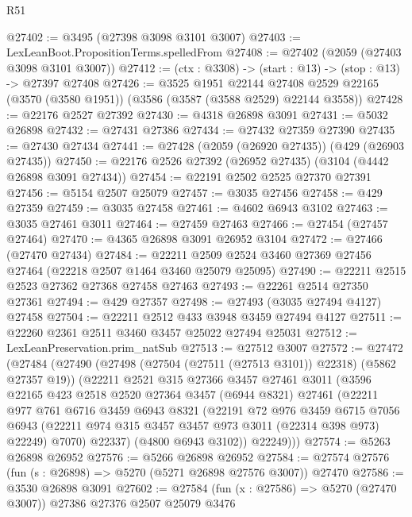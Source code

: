 \begin{lexlean}{R51}
\begin{coremodule}
@27402 := @3495 (@27398 @3098 @3101 @3007)
@27403 := LexLeanBoot.PropositionTerms.spelledFrom
@27408 := @27402 (@2059 (@27403 @3098 @3101 @3007))
@27412 := (ctx : @3308) -> (start : @13) -> (stop : @13) -> @27397 @27408
@27426 := @3525
    @1951
    @22144
    @27408
    @2529
    @22165
    (@3570 (@3580 @1951))
    (@3586 (@3587 (@3588 @2529) @22144 @3558))
@27428 := @22176 @2527 @27392
@27430 := @4318 @26898 @3091
@27431 := @5032 @26898
@27432 := @27431 @27386
@27434 := @27432 @27359 @27390
@27435 := @27430 @27434
@27441 := @27428 (@2059 (@26920 @27435)) (@429 (@26903 @27435))
@27450 := @22176 @2526 @27392 (@26952 @27435) (@3104 (@4442 @26898 @3091 @27434))
@27454 := @22191 @2502 @2525 @27370 @27391
@27456 := @5154 @2507 @25079
@27457 := @3035 @27456
@27458 := @429 @27359
@27459 := @3035 @27458
@27461 := @4602 @6943 @3102
@27463 := @3035 @27461 @3011
@27464 := @27459 @27463
@27466 := @27454 (@27457 @27464)
@27470 := @4365 @26898 @3091 @26952 @3104
@27472 := @27466 (@27470 @27434)
@27484 := @22211 @2509 @2524 @3460 @27369 @27456 @27464 (@22218 @2507 @1464 @3460 @25079 @25095)
@27490 := @22211 @2515 @2523 @27362 @27368 @27458 @27463
@27493 := @22261 @2514 @27350 @27361
@27494 := @429 @27357
@27498 := @27493 (@3035 @27494 @4127) @27458
@27504 := @22211 @2512 @433 @3948 @3459 @27494 @4127
@27511 := @22260 @2361 @2511 @3460 @3457 @25022 @27494 @25031
@27512 := LexLeanPreservation.prim_natSub
@27513 := @27512 @3007
@27572 := @27472
    (@27484
      (@27490
        (@27498 (@27504 (@27511 (@27513 @3101)) @22318) (@5862 @27357 @19))
        (@22211
          @2521
          @315
          @27366
          @3457
          @27461
          @3011
          (@3596
            @22165
            @423
            @2518
            @2520
            @27364
            @3457
            (@6944 @8321)
            @27461
            (@22211
              @977
              @761
              @6716
              @3459
              @6943
              @8321
              (@22191
                @72
                @976
                @3459
                @6715
                @7056
                @6943
                (@22211 @974 @315 @3457 @3457 @973 @3011 (@22314 @398 @973) @22249)
                @7070)
              @22337)
            (@4800 @6943 @3102))
          @22249)))
@27574 := @5263 @26898 @26952
@27576 := @5266 @26898 @26952
@27584 := @27574 @27576 (fun (s : @26898) => @5270 (@5271 @26898 @27576 @3007)) @27470
@27586 := @3530 @26898 @3091
@27602 := @27584
    (fun (x : @27586) => @5270 (@27470 @3007))
    @27386
    @27376
    @2507
    @25079
    @3476

\end{coremodule}
\end{lexlean}
